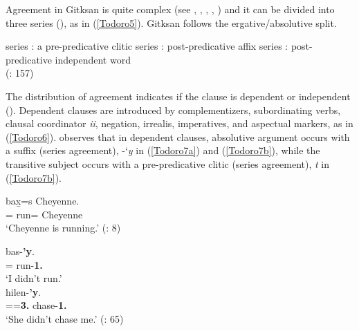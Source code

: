 \documentclass[output=paper]{langscibook}
\begin{document}
Agreement in Gitksan is quite complex (see \citealt{davis2011a}, \citealt{davis2015a}, \citealt{forbes2017a}, \citeyear{forbes2018a}, \citeyear{forbes2019a}) and it can be divided into three series (\citealt{rigsby1986a}), as in (\ref{Todoro5}). Gitksan follows the ergative/absolutive split. 


\begin{exe}
\ex \label{Todoro5}
\begin{xlist}
\ex \label{Todoro5a}
series {\seriesI}: a pre-predicative clitic 
\ex \label{Todoro5b}
series {\seriesII}: post-predicative affix 
\ex \label{Todoro5c}
series {\seriesIII}: post-predicative independent word \\ 
(\citealt{davis2015a}: 157)
\end{xlist}
\end{exe}

The distribution of agreement indicates if the clause is dependent or independent (\citealt{rigsby1986a}). Dependent clauses are introduced by complementizers, subordinating verbs, clausal coordinator \textit{ii}, negation, irrealis, imperatives, and aspectual markers, as in (\ref{Todoro6}). \citet{forbes2019a} observes that in dependent clauses, absolutive argument occurs with a suffix (series {\seriesII} agreement), -‘\emph{y} in (\ref{Todoro7a}) and (\ref{Todoro7b}), while the transitive subject occurs with a pre-predicative clitic (series {\seriesI} agreement),  \emph{t} in (\ref{Todoro7b}). 


\begin{exe}
\ex \label{Todoro6}
 {bax̱=s} {Cheyenne.} \\
{\prog}={\cn} run={\pn} Cheyenne \\
\glt `Cheyenne is running.' (\citealt{schwan2019a}: 8)
\end{exe}


\begin{exe}
\ex \label{Todoro7}
\begin{xlist}

\ex \label{Todoro7a} 
 {bas-\textbf{'y}.}\\
    {\glossNeg}={\foc} run-\textbf{1{\sg}.{\seriesII}}\\
\glt `I didn't run.’  \citep[65]{forbes2019a}\\

\ex \label{Todoro7b}
 hilen-\textbf{'y}.\\
    {\glossNeg}={\foc}=\textbf{3.{\seriesI}} chase-\textbf{1{\sg}.{\seriesII}} \\
\glt `She didn't chase me.’ (\citealt{forbes2019a}: 65) \\

\end{xlist}
\end{exe}
\end{document}
